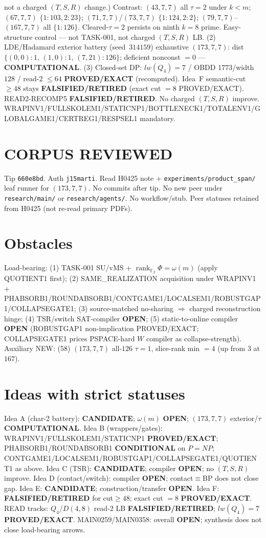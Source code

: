 \documentclass[11pt]{article}
\begin{document}
not a charged $(T,S,R)$ change.)
Contrast: $(43,7,7)$ all $\tau{=}2$ under $k{<}m$; $(67,7,7)$ $\{1{:}103,2{:}23\}$;
$(71,7,7)$/$(73,7,7)$ $\{1{:}124,2{:}2\}$; $(79,7,7)$--$(167,7,7)$ all $\{1{:}126\}$.
Cleared-$\tau{=}2$ persists on ninth $k{=}8$ prime. Easy-structure control --- not TASK-001,
not charged $(T,S,R)$ LB.
(2) LDE/Hadamard exterior battery (seed~$314159$) exhaustive $(173,7,7)$:
dist $\{(0,0){:}1,\,(1,0){:}1,\,(7,21){:}126\}$; deficient nonconst $=0$ --- \textbf{COMPUTATIONAL}.
(3) Closed-set DP: $lw(Q_4)=7$ / OBDD $1773$/width $128$ / read-$2$ $\le64$
\textbf{PROVED/EXACT} (recomputed).
Idea~F semantic-cut $\ge48$ stays \textbf{FALSIFIED/RETIRED} (exact cut $=8$ PROVED/EXACT).
READ2-RECOMP5 \textbf{FALSIFIED/RETIRED}. No charged $(T,S,R)$ improve.
WRAPINV1/FULLSKOLEM1/STATICNP1/BOTTLENECK1/TOTALENV1/GLOBALGAME1/CERTREG1/RESPSEL1 mandatory.

\section*{CORPUS REVIEWED}
Tip \texttt{660e8bd}. Auth \texttt{j15marti}. Read H0425 note +
\texttt{experiments/product\_span/} leaf runner for $(173,7,7)$.
No commits after tip. No new peer under \texttt{research/main/} or \texttt{research/agents/}.
No workflow/stub. Peer statuses retained from H0425 (not re-read primary PDFs).

\section*{Obstacles}
Load-bearing: (1) TASK-001 SU/vMS + $\operatorname{rank}_{\mathbb F_2}\Phi=\omega(m)$ (apply QUOTIENT1 first);
(2) SAME\_REALIZATION acquisition under WRAPINV1 + PHABSORB1/ROUNDABSORB1/CONTGAME1/LOCALSEM1/ROBUSTGAP1/COLLAPSEGATE1;
(3) source-matched no-sharing $\Rightarrow$ charged reconstruction hinge;
(4) TSR/switch SAT-compiler \textbf{OPEN};
(5) static-to-online compiler \textbf{OPEN} (ROBUSTGAP1 non-implication PROVED/EXACT;
COLLAPSEGATE1 prices PSPACE-hard $W$ compiler as collapse-strength).
Auxiliary NEW: (58) $(173,7,7)$ all-$126$ $\tau{=}1$, slice-rank min $=4$ (up from $3$ at $167$).

\section*{Ideas with strict statuses}
Idea A (char-2 battery): \textbf{CANDIDATE}; $\omega(m)$ \textbf{OPEN}; $(173,7,7)$ exterior/$\tau$ \textbf{COMPUTATIONAL}.
Idea B (wrappers/gates): WRAPINV1/FULLSKOLEM1/STATICNP1 \textbf{PROVED/EXACT};
PHABSORB1/ROUNDABSORB1 \textbf{CONDITIONAL} on $P=NP$;
CONTGAME1/LOCALSEM1/ROBUSTGAP1/COLLAPSEGATE1/QUOTIENT1 as above.
Idea C (TSR): \textbf{CANDIDATE}; compiler \textbf{OPEN}; no $(T,S,R)$ improve.
Idea D (contact/switch): compiler \textbf{OPEN}; contact$\equiv$BP does not close gap.
Idea E: \textbf{CANDIDATE}; construction/transfer \textbf{OPEN}.
Idea F: \textbf{FALSIFIED/RETIRED} for cut$\ge48$; exact cut $=8$ \textbf{PROVED/EXACT}.
READ tracks: $Q_4$/$D(4,8)$ read-$2$ LB \textbf{FALSIFIED/RETIRED}; $lw(Q_4)=7$ \textbf{PROVED/EXACT}.
MAIN0259/MAIN0358: overall \textbf{OPEN}; synthesis does not close load-bearing arrows.
\end{document}
